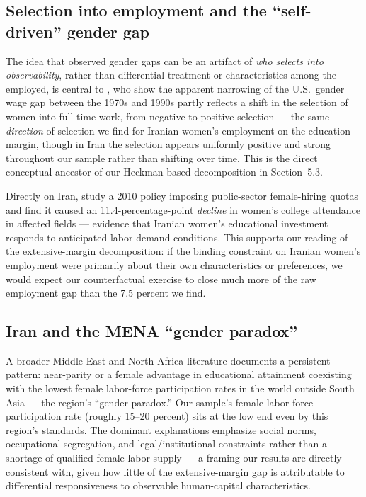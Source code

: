 \documentclass[11pt]{article}
\begin{document}
\subsection{Selection into employment and the ``self-driven'' gender gap}

The idea that observed gender gaps can be an artifact of \emph{who selects into observability}, rather than differential treatment or characteristics among the employed, is central to \citet{mulligan2008}, who show the apparent narrowing of the U.S.\ gender wage gap between the 1970s and 1990s partly reflects a shift in the selection of women into full-time work, from negative to positive selection --- the same \emph{direction} of selection we find for Iranian women's employment on the education margin, though in Iran the selection appears uniformly positive and strong throughout our sample rather than shifting over time. This is the direct conceptual ancestor of our Heckman-based decomposition in Section~5.3.

Directly on Iran, \citet{tanaka2023} study a 2010 policy imposing public-sector female-hiring quotas and find it caused an 11.4-percentage-point \emph{decline} in women's college attendance in affected fields --- evidence that Iranian women's educational investment responds to anticipated labor-demand conditions. This supports our reading of the extensive-margin decomposition: if the binding constraint on Iranian women's employment were primarily about their own characteristics or preferences, we would expect our counterfactual exercise to close much more of the raw employment gap than the 7.5 percent we find.

\subsection{Iran and the MENA ``gender paradox''}

A broader Middle East and North Africa literature documents a persistent pattern: near-parity or a female advantage in educational attainment coexisting with the lowest female labor-force participation rates in the world outside South Asia --- the region's ``gender paradox.'' Our sample's female labor-force participation rate (roughly 15--20 percent) sits at the low end even by this region's standards. The dominant explanations emphasize social norms, occupational segregation, and legal/institutional constraints rather than a shortage of qualified female labor supply --- a framing our results are directly consistent with, given how little of the extensive-margin gap is attributable to differential responsiveness to observable human-capital characteristics.
\end{document}
